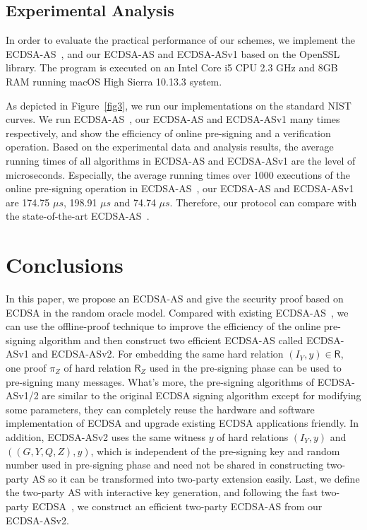 \documentclass{llncs}
\begin{document}
\subsection{Experimental Analysis}

In order to evaluate the practical performance of our schemes, we implement the ECDSA-AS~\cite{AumayrEEFHMMR20}, and our ECDSA-AS and ECDSA-ASv1 based on the OpenSSL library. The program is executed on an Intel Core i5 CPU 2.3 GHz and 8GB RAM running macOS High Sierra 10.13.3 system.
 
As depicted in Figure~\ref{fig3}, we run our implementations on the standard NIST curves. We run ECDSA-AS~\cite{AumayrEEFHMMR20}, our ECDSA-AS and ECDSA-ASv1 many times respectively, and show the efficiency of online pre-signing and a verification operation. Based on the experimental data and analysis results, the average running times of all algorithms in ECDSA-AS and ECDSA-ASv1 are the level of microseconds. Especially, the average running times over 1000 executions of the online pre-signing operation in ECDSA-AS~\cite{AumayrEEFHMMR20}, our ECDSA-AS and ECDSA-ASv1 are 174.75 $\mu s$, 198.91 $\mu s$ and 74.74 $\mu s$. Therefore, our protocol can compare with the state-of-the-art ECDSA-AS~\cite{AumayrEEFHMMR20}.  

\section{Conclusions}

In this paper, we propose an ECDSA-AS and give the security proof based on ECDSA in the random oracle model. Compared with existing ECDSA-AS~\cite{Moreno-Sanchez2018,AumayrEEFHMMR20}, we can use the offline-proof technique to improve the efficiency of the online pre-signing algorithm and then construct two efficient ECDSA-AS called ECDSA-ASv1 and ECDSA-ASv2. For embedding the same hard relation $(I_Y,y)\in \mathsf{R}$, one proof $\pi_Z$ of hard relation $\mathsf{R}_Z$ used in the pre-signing phase can be used to pre-signing many messages. What's more, the pre-signing algorithms of ECDSA-ASv1/2 are similar to the original ECDSA signing algorithm except for modifying some parameters, they can completely reuse the hardware and software implementation of ECDSA and upgrade existing ECDSA applications friendly. In addition, ECDSA-ASv2 uses the same witness $y$ of hard relations $(I_Y,y)$ and $((G, Y, Q, Z), y)$, which is independent of the pre-signing key and random number used in pre-signing phase and need not be shared in constructing two-party AS so it can be transformed into two-party extension easily. Last, we define the two-party AS with interactive key generation, and following the fast two-party ECDSA~\cite{Lin17}, we construct an efficient two-party ECDSA-AS from our ECDSA-ASv2.  
\end{document}
